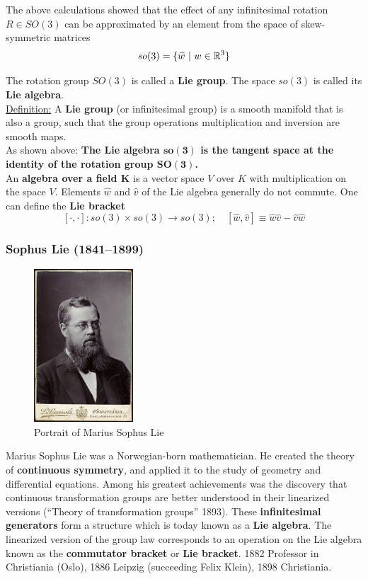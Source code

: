 The above calculations showed that the effect of any infinitesimal
rotation $R \in SO(3)$ can be approximated by an element from
the space of skew-symmetric matrices
	\[so(3) = \{ \widehat{w}\ |\ w \in \mathbb{R}^3\}\]

The rotation group $SO(3)$ is called a \textbf{Lie group}.
The space $so(3)$ is called its \textbf{Lie algebra}.\\

\underline{Definition:}
A \textbf{Lie group} (or infinitesimal group) is a smooth manifold that
is also a group, such that the group operations multiplication
and inversion are smooth maps.\\

As shown above: \textbf{The Lie algebra $\bm{so(3)}$ is the tangent space
at the identity of the rotation group $\bm{SO(3)}$.}\\

An \textbf{algebra over a field $\bm{K}$} is a vector space $V$ over $K$
with multiplication on the space $V$.
Elements $\widehat{w}$ and $\widehat{v}$ of the Lie algebra
generally do not commute.
One can define the \textbf{Lie bracket}
\[[\cdot,\cdot]: so(3) \times so(3) \rightarrow so(3);\quad
[\widehat{w},\widehat{v}] \equiv \widehat{w}\widehat{v} - \widehat{v}\widehat{w}\]


\subsubsection{Sophus Lie (1841--1899)}%
\label{ssub:sophus_lie_1841_1899_}

\begin{figure}[ht]
\centering
\includegraphics[width=10em]{img/sophus_lie.jpg}
\caption*{Portrait of Marius Sophus Lie}
\end{figure}

Marius Sophus Lie was a Norwegian-born mathematician.
He created the theory of \textbf{continuous symmetry}, and applied it to
the study of geometry and differential equations. Among his greatest
achievements was the discovery that continuous transformation
groups are better understood in their linearized versions
(``Theory of transformation groups'' 1893).
These \textbf{infinitesimal generators} form a structure which is today
known as a \textbf{Lie algebra}. The linearized version of the group law
corresponds to an operation on the Lie algebra known as
the \textbf{commutator bracket} or \textbf{Lie bracket}.
1882 Professor in Christiania (Oslo),
1886 Leipzig (succeeding Felix Klein),
1898 Christiania.


